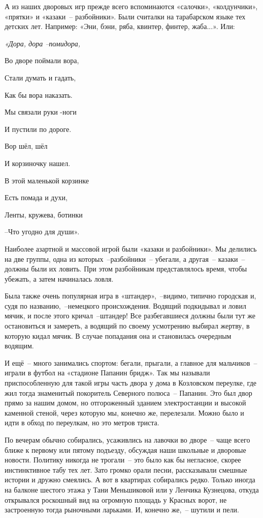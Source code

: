 А из наших дворовых игр прежде всего вспоминаются «салочки», «колдунчики», «прятки» и «казаки~-- разбойники». Были считалки на тарабарском языке тех детских лет. Например: «Эни, бэни, ряба, квинтер, финтер, жаба...». Или:

\indent

{\itshape
«Дора, дора --помидора,

 Во дворе поймали вора,
 
  Стали думать и гадать,
  
Как бы вора наказать.

Мы связали руки -ноги
 
И пустили по дороге. 

Вор шёл, шёл 

И корзиночку нашел. 

В этой маленькой корзинке 

Есть помада и духи, 

Ленты, кружева, ботинки
 
--Что угодно для души».

}

\indent

Наиболее азартной и массовой игрой были «казаки и разбойники». Мы делились на две группы, одна из которых~--разбойники~-- убегали, а другая~-- казаки~-- должны были их ловить. При этом разбойникам представлялось время, чтобы убежать, а затем начиналась ловля.

Была также очень популярная игра в «штандер»,~--видимо, типично городская и, судя по названию,~--немецкого происхождения. Водящий подкидывал и ловил мячик, и после этого кричал~--штандер! Все разбегавшиеся должны были тут же остановиться и замереть, а водящий по своему усмотрению выбирал жертву, в которую кидал мячик. В случае попадания она и становилась очередным водящим.

И ещё~-- много занимались спортом: бегали, прыгали, а главное для мальчиков~-- играли в футбол на «стадионе Папанин бридж». Так мы называли приспособленную для такой игры часть двора у дома в Козловском переулке, где жил тогда знаменитый покоритель Северного полюса~-- Папанин. Это был двор прямо за нашим домом, но отгороженный зданием электростанции и высокой каменной стеной, через которую мы, конечно же, перелезали. Можно было и идти в обход по переулкам, но это метров триста.

По вечерам обычно собирались, усаживлись на лавочки во дворе~-- чаще всего ближе к первому или пятому подъезду, обсуждая наши школьные и дворовые новости. Политику никогда не трогали~-- это было как бы негласное, скорее инстинктивное табу тех лет. Зато громко орали песни, рассказывали смешные истории и дружно смеялись. А вот в квартирах собирались редко. Только иногда на балконе шестого этажа у Тани Меньшиковой или у Ленчика Кузнецова, откуда открывался роскошный вид на огромную площадь у Красных ворот, не застроенную тогда рыночными ларьками. И, конечно же,~-- шутили и пели.

